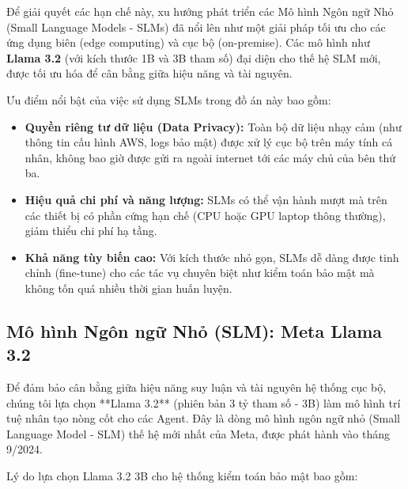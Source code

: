 Để giải quyết các hạn chế này, xu hướng phát triển các Mô hình Ngôn ngữ Nhỏ (Small Language Models - SLMs) đã nổi lên như một giải pháp tối ưu cho các ứng dụng biên (edge computing) và cục bộ (on-premise). Các mô hình như \textbf{Llama 3.2} (với kích thước 1B và 3B tham số) đại diện cho thế hệ SLM mới, được tối ưu hóa để cân bằng giữa hiệu năng và tài nguyên.



Ưu điểm nổi bật của việc sử dụng SLMs trong đồ án này bao gồm:
\begin{itemize}
    \item \textbf{Quyền riêng tư dữ liệu (Data Privacy):} Toàn bộ dữ liệu nhạy cảm (như thông tin cấu hình AWS, logs bảo mật) được xử lý cục bộ trên máy tính cá nhân, không bao giờ được gửi ra ngoài internet tới các máy chủ của bên thứ ba.
    \item \textbf{Hiệu quả chi phí và năng lượng:} SLMs có thể vận hành mượt mà trên các thiết bị có phần cứng hạn chế (CPU hoặc GPU laptop thông thường), giảm thiểu chi phí hạ tầng.
    \item \textbf{Khả năng tùy biến cao:} Với kích thước nhỏ gọn, SLMs dễ dàng được tinh chỉnh (fine-tune) cho các tác vụ chuyên biệt như kiểm toán bảo mật mà không tốn quá nhiều thời gian huấn luyện.
\end{itemize}

\subsection{Mô hình Ngôn ngữ Nhỏ (SLM): Meta Llama 3.2}

Để đảm bảo cân bằng giữa hiệu năng suy luận và tài nguyên hệ thống cục bộ, chúng tôi lựa chọn **Llama 3.2** (phiên bản 3 tỷ tham số - 3B) làm mô hình trí tuệ nhân tạo nòng cốt cho các Agent. Đây là dòng mô hình ngôn ngữ nhỏ (Small Language Model - SLM) thế hệ mới nhất của Meta, được phát hành vào tháng 9/2024.

Lý do lựa chọn Llama 3.2 3B cho hệ thống kiểm toán bảo mật bao gồm:


